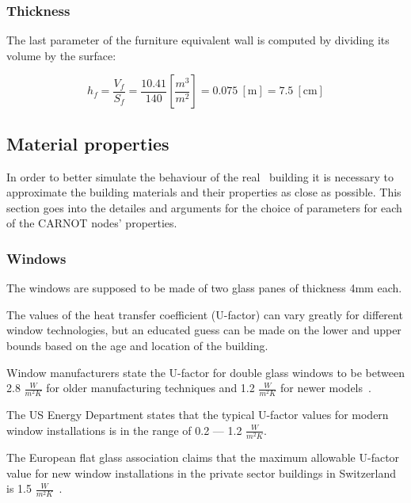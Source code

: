\subsubsection*{Thickness}

The last parameter of the furniture equivalent wall is computed by dividing its
volume by the surface:

\begin{equation}
    h_f = \frac{V_f}{S_f} = \frac{10.41}{140} \left[\frac{m^3}{m^2}\right] =
    0.075\ \left[\text{m}\right] = 7.5\ \left[\text{cm}\right]
\end{equation}


\subsection{Material properties}

In order to better simulate the behaviour of the real \pdome\ building it is
necessary to approximate the building materials and their properties as close as
possible. This section goes into the detailes and arguments for the choice of
parameters for each of the CARNOT nodes' properties.

\subsubsection{Windows}

The windows are supposed to be made of two glass panes of thickness 4mm each.

The values of the heat transfer coefficient (U-factor) can vary greatly for
different window technologies, but an educated guess can be made on the lower
and upper bounds based on the age and location of the building. 

Window manufacturers state
the U-factor for double glass windows to be between 2.8 \(\frac{W}{m^2K}\) for
older manufacturing techniques and 1.2 \(\frac{W}{m^2K}\) for newer
models~\cite{WhatAreTypical2018}. 

The US Energy Department states that the
typical U-factor values for modern window installations is in the range of 0.2
--- 1.2 \(\frac{W}{m^2K}\)\cite{GuideEnergyEfficientWindows}. 

The European flat glass association claims that the maximum allowable U-factor
value for new window installations in the private sector buildings in
Switzerland is 1.5
\(\frac{W}{m^2K}\)~\cite{glassforeuropeMinimumPerformanceRequirements2018}.

